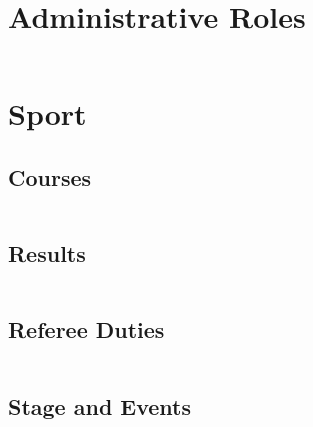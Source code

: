 \documentclass[
    a4paper,
    oneside,
    10pt
]{article}
\newenvironment{timeline}{%
	\begin{longtable}{ c | c }%
}{%
	\end{longtable}%
}
\begin{document}
    \section{Administrative Roles}
    \begin{timeline}
    		
    \end{timeline}
    
    \section{Sport}
    	\subsection{Courses}
    	\begin{timeline}
    		
    \end{timeline}
    
    	\subsection{Results}
    	\begin{timeline}
    		
    \end{timeline}
    
    \subsection{Referee Duties}
    	\begin{timeline}
    		
    \end{timeline}
    
    \subsection{Stage and Events}
    	\begin{timeline}
    		
    \end{timeline}
    
    \pagebreak
    \tableofcontents
\end{document}
